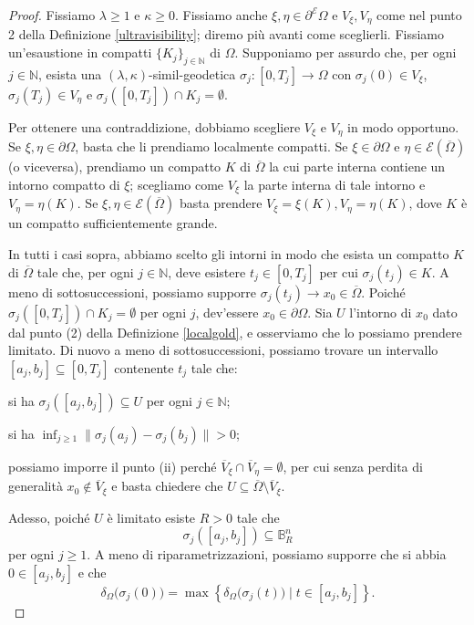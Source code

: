 \begin{proof}
    Fissiamo $\lambda\ge1$ e $\kappa\ge0$. Fissiamo anche $\xi,\eta\in\partial^\mathcal{E}\Omega$ e $V_\xi,V_\eta$ come nel punto 2 della Definizione \ref{ultravisibility}; diremo più avanti come sceglierli. Fissiamo un'esaustione in compatti $\{K_j\}_{j\in\mathbb{N}}$ di $\Omega$. Supponiamo per assurdo che, per ogni $j\in\mathbb{N}$, esista una $(\lambda,\kappa)$-simil-geodetica $\sigma_j:[0,T_j]\longrightarrow\Omega$ con $\sigma_j(0)\in V_\xi$, $\sigma_j(T_j)\in V_\eta$ e ${\sigma_j([0,T_j])\cap K_j=\emptyset}$.

    Per ottenere una contraddizione, dobbiamo scegliere $V_\xi$ e $V_\eta$ in modo opportuno. Se $\xi,\eta\in\partial\Omega$, basta che li prendiamo localmente compatti. Se $\xi\in\partial\Omega$ e $\eta\in\mathcal{E}(\overline{\Omega})$ (o viceversa), prendiamo un compatto $K$ di $\overline{\Omega}$ la cui parte interna contiene un intorno compatto di $\xi$; scegliamo come $V_\xi$ la parte interna di tale intorno e $V_\eta=\eta(K)$. Se $\xi,\eta\in\mathcal{E}(\overline{\Omega})$ basta prendere $V_\xi=\xi(K),V_\eta=\eta(K)$, dove $K$ è un compatto sufficientemente grande.

    In tutti i casi sopra, abbiamo scelto gli intorni in modo che esista un compatto $K$ di $\overline{\Omega}$ tale che, per ogni $j\in\mathbb{N}$, deve esistere $t_j\in[0,T_j]$ per cui $\sigma_j(t_j)\in K$. A meno di sottosuccessioni, possiamo supporre $\sigma_j(t_j)\longrightarrow x_0\in\overline{\Omega}$. Poiché $\sigma_j([0,T_j])\cap K_j=\emptyset$ per ogni $j$, dev'essere $x_0\in\partial\Omega$. Sia $U$ l'intorno di $x_0$ dato dal punto (2) della Definizione \ref{localgold}, e osserviamo che lo possiamo prendere limitato. Di nuovo a meno di sottosuccessioni, possiamo trovare un intervallo $[a_j,b_j]\subseteq[0,T_j]$ contenente $t_j$ tale che:
    \begin{nlist}
        \item si ha $\sigma_j([a_j,b_j])\subseteq U$ per ogni $j\in\mathbb{N}$;
        \item si ha $\displaystyle\inf_{j\ge 1}\|\sigma_j(a_j)-\sigma_j(b_j)\|>0$;
    \end{nlist}
    possiamo imporre il punto (ii) perché $\overline{V}_\xi\cap\overline{V}_\eta=\emptyset$, per cui senza perdita di generalità $x_0\not\in\overline{V}_\xi$ e basta chiedere che $U\subseteq\overline{\Omega}\setminus\overline{V}_\xi$.

    Adesso, poiché $U$ è limitato esiste $R>0$ tale che
    \begin{equation}\label{boundiamo}
        \sigma_j([a_j,b_j])\subseteq\mathbb{B}^n_R
    \end{equation}
    per ogni $j\ge 1$. A meno di riparametrizzazioni, possiamo supporre che si abbia $0\in[a_j,b_j]$ e che
    $$\delta_\Omega\big(\sigma_j(0)\big)=\max\left\{\delta_\Omega\big(\sigma_j(t)\big)\mid t\in[a_j,b_j]\right\}.$$


\end{proof}
